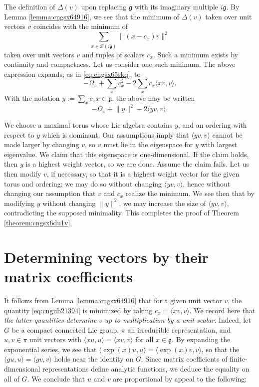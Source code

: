 \documentclass[reqno]{amsart} 
\begin{document}
The definition of $\Delta(v)$ upon replacing $\mathfrak{g}$ with its imaginary multiple $i \mathfrak{g}$.  By Lemma \ref{lemma:cngsx64916}, we see that the minimum of $\Delta(v)$ taken over unit vectors $v$ coincides with the minimum of
\begin{equation}\label{eq:cngub21394}
  \sum_{x \in \mathcal{B}(i \mathfrak{g})}
  \lVert (x - c_x) v \rVert^2
\end{equation}
taken over unit vectors $v$ and tuples of scalars $c_x$.  Such a minimum exists by continuity and compactness.  Let us consider one such minimum.    The above expression expands, as in \eqref{eq:cngsx65skq}, to
\begin{equation*}
  - \Omega_\pi + \sum_x c_x^2 - 2 \sum_{x} c_x \langle x v, v \rangle.
\end{equation*}
With the notation $y := \sum_x c_x x \in \mathfrak{g}$, the above may be written
\begin{equation*}
  - \Omega_\pi + \lVert y \rVert^2 - 2 \langle y v, v \rangle.
\end{equation*}

We choose a maximal torus whose Lie algebra contains $y$, and an ordering with respect to $y$ which is dominant.  Our assumptions imply that $\langle y v, v \rangle$ cannot be made larger by changing $v$, so $v$ must lie in the eigenspace for $y$ with largest eigenvalue.  We claim that this eigenspace is one-dimensional.  If the claim holds, then $y$ is a highest weight vector, so we are done.  Assume the claim fails.  Let us then modify $v$, if necessary, so that it is a highest weight vector for the given torus and ordering; we may do so without changing $\langle y v, v \rangle$, hence without changing our assumption that $v$ and $c_x$ realize the minimum.  We see then that by modifying $y$ without changing $\lVert y \rVert^2$, we may increase the size of $\langle y v, v \rangle$, contradicting the supposed minimality.  This completes the proof of Theorem \ref{theorem:cngsx6du1v}.



\section{Determining vectors by their matrix coefficients}\label{sec:cngub4lcsx}
It follows from Lemma \ref{lemma:cngsx64916} that for a given unit vector $v$, the quantity \eqref{eq:cngub21394} is minimized by taking $c_x = \langle x v, v \rangle$.  We record here that \emph{the latter quantities determine} $v$ \emph{up to multiplication by a unit scalar}.  Indeed, let $G$ be a compact connected Lie group, $\pi$ an irreducible representation, and $u, v \in \pi$ unit vectors with $\langle x u, u \rangle = \langle x v, v \rangle$ for all $x \in \mathfrak{g}$.  By expanding the exponential series, we see that $\langle \exp(x) u, u \rangle = \langle \exp(x) v, v \rangle$, so that the
$\langle g u, u \rangle = \langle g v, v \rangle$ holds near the identity on $G$.  Since matrix coefficients of finite-dimensional representations define analytic functions, we deduce the equality on all of $G$.  We conclude that $u$ and $v$ are proportional by appeal to the following:
\end{document}
